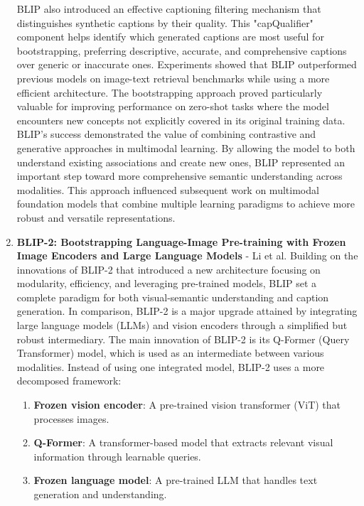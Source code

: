 \documentclass[conference]{IEEEtran}
\begin{document}
\begin{enumerate}
BLIP also introduced an effective captioning filtering mechanism that distinguishes synthetic captions by their quality. This "capQualifier" component helps identify which generated captions are most useful for bootstrapping, preferring descriptive, accurate, and comprehensive captions over generic or inaccurate ones.
Experiments showed that BLIP outperformed previous models on image-text retrieval benchmarks while using a more efficient architecture. The bootstrapping approach proved particularly valuable for improving performance on zero-shot tasks where the model encounters new concepts not explicitly covered in its original training data.
BLIP's success demonstrated the value of combining contrastive and generative approaches in multimodal learning. By allowing the model to both understand existing associations and create new ones, BLIP represented an important step toward more comprehensive semantic understanding across modalities. This approach influenced subsequent work on multimodal foundation models that combine multiple learning paradigms to achieve more robust and versatile representations.

\item \textbf{BLIP-2: Bootstrapping Language-Image Pre-training with Frozen Image Encoders and Large Language Models} - Li et al. \cite{li2023blip2} Building on the innovations of BLIP-2 that introduced a new architecture focusing on modularity, efficiency, and leveraging pre-trained models, BLIP set a complete paradigm for both visual-semantic understanding and caption generation. In comparison, BLIP-2 is a major upgrade attained by integrating large language models (LLMs) and vision encoders through a simplified but robust intermediary.
The main innovation of BLIP-2 is its Q-Former (Query Transformer) model, which is used as an intermediate between various modalities. Instead of using one integrated model, BLIP-2 uses a more decomposed framework:

\begin{enumerate}
    \item \textbf{Frozen vision encoder}: A pre-trained vision transformer (ViT) that processes images.
    \item \textbf{Q-Former}: A transformer-based model that extracts relevant visual information through learnable queries.
    \item \textbf{Frozen language model}: A pre-trained LLM that handles text generation and understanding.
\end{enumerate}


\end{enumerate}
\end{document}
